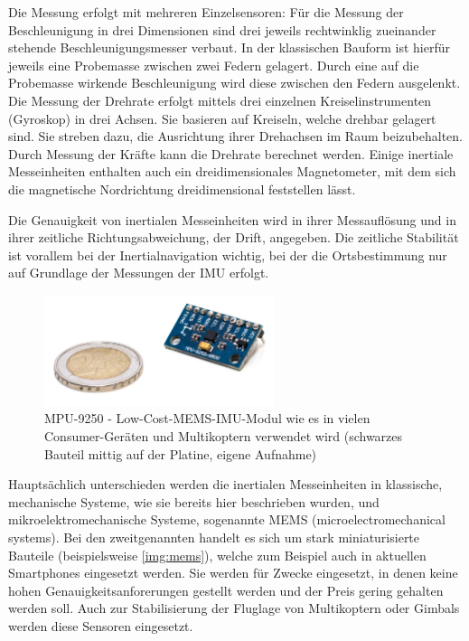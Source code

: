 \documentclass[a4paper,12pt,bibliography=totoc, listof=totoc,titlepage,pointlessnumbers]{scrreprt}
\begin{document}
Die Messung erfolgt mit mehreren Einzelsensoren: Für die Messung der Beschleunigung in drei Dimensionen sind drei jeweils rechtwinklig zueinander stehende Beschleunigungsmesser verbaut. In der klassischen Bauform ist hierfür jeweils eine Probemasse zwischen zwei Federn gelagert. Durch eine auf die Probemasse wirkende Beschleunigung wird diese zwischen den Federn ausgelenkt. Die Messung der Drehrate erfolgt mittels drei einzelnen Kreiselinstrumenten (Gyroskop) in drei Achsen. Sie basieren auf Kreiseln, welche drehbar gelagert sind. Sie streben dazu, die Ausrichtung ihrer Drehachsen im Raum beizubehalten. Durch Messung der Kräfte kann die Drehrate berechnet werden. Einige inertiale Messeinheiten enthalten auch ein dreidimensionales Magnetometer, mit dem sich die magnetische Nordrichtung dreidimensional feststellen lässt. \citep[S. 10]{willemsen}

Die Genauigkeit von inertialen Messeinheiten wird in ihrer Messauflösung und in ihrer zeitliche Richtungsabweichung, der Drift, angegeben. Die zeitliche Stabilität ist vorallem bei der Inertialnavigation wichtig, bei der die Ortsbestimmung nur auf Grundlage der Messungen der IMU erfolgt.

\begin{figure}[!ht]
 \centering
 \includegraphics[width=0.6\textwidth]{./img/mems.jpg}
 \caption{MPU-9250 - Low-Cost-MEMS-IMU-Modul wie es in vielen Consumer-Geräten und Multikoptern verwendet wird (schwarzes Bauteil mittig auf der Platine, eigene Aufnahme)}
 \label{img:mems}
\end{figure}

Hauptsächlich unterschieden werden die inertialen Messeinheiten in klassische, mechanische Systeme, wie sie bereits hier beschrieben wurden, und mikroelektromechanische Systeme, sogenannte MEMS (microelectromechanical systems). Bei den zweitgenannten handelt es sich um stark miniaturisierte Bauteile (beispielsweise \autoref{img:mems}), welche zum Beispiel auch in aktuellen Smartphones eingesetzt werden. Sie werden für Zwecke eingesetzt, in denen keine hohen Genauigkeitsanforerungen gestellt werden und der Preis gering gehalten werden soll. Auch zur Stabilisierung der Fluglage von Multikoptern oder Gimbals werden diese Sensoren eingesetzt.\citep[S. 9f]{willemsen}
\end{document}
